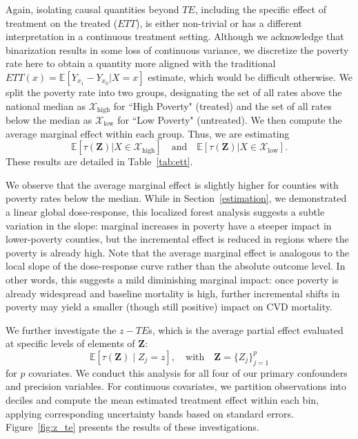 \documentclass{article}
\theoremstyle{plain}
\theoremstyle{definition}
\theoremstyle{remark}
\begin{document}
Again, isolating causal quantities beyond $TE$, including the specific effect of treatment 
on the treated ($ETT$), is either non-trivial or has a different interpretation in a continuous treatment setting.
Although we acknowledge that binarization results in some loss of continuous variance, 
we discretize the poverty rate here to obtain a quantity more aligned with the traditional $ETT(x) = \mathbb E[Y_{x_1}-Y_{x_0}|X=x]$ estimate, which would be difficult otherwise. We split the poverty rate into two groups, designating the set of all rates above 
the national median as $\mathcal X_{\text{high}}$ for ``High Poverty" (treated) and the set of all rates below the median 
as $\mathcal X_{\text{low} }$ for ``Low Poverty" (untreated). We then compute the average marginal effect 
within each group. Thus, we are estimating $$\mathbb E[\tau(\mathbf Z)|X \in \mathcal X_{\text{high}}] \quad \text{and} \quad
\mathbb E[\tau(\mathbf Z)|X \in \mathcal X_{\text{low}}].$$
These results are detailed in Table~\ref{tab:ett}.

We observe that the average marginal effect is slightly higher for counties 
with poverty rates below the median. While in 
Section~\ref{estimation}, we demonstrated a linear global dose-response, 
this localized forest analysis suggests a subtle variation in the slope: 
marginal increases in poverty have a steeper impact in 
lower-poverty counties, but the incremental effect is reduced 
in regions where the poverty is already high. Note that the average marginal effect is analogous to the local 
slope of the dose-response curve rather than the absolute outcome level.
In other words, this suggests a mild diminishing marginal impact: once poverty is 
already widespread and baseline mortality is high, further incremental shifts 
in poverty may yield a smaller (though still positive) impact on CVD 
mortality.



We further investigate the $z-TE$s, which is the average partial effect 
evaluated at specific levels of elements of $\mathbf{Z}$: $$\mathbb{E}[\tau(\mathbf{Z}) \mid Z_j = z], \quad \text{with} \quad\mathbf{Z} = \{Z_j\}_{j=1}^p$$ for $p$ covariates. We conduct this 
analysis for all four of our primary confounders and precision variables. For 
continuous covariates, we partition observations into deciles and compute the 
mean estimated treatment effect within each bin, applying corresponding 
uncertainty bands based on standard errors. Figure~\ref{fig:z_te} presents 
the results of these investigations.
\end{document}
